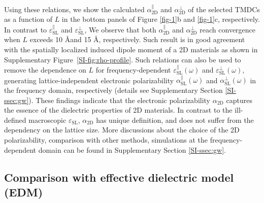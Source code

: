 %
%
Using these relations, we show the calculated
$\alpha_{\mathrm{2D}}^{\parallel}$ and $\alpha_{\mathrm{2D}}^{\perp}$
of the selected TMDCs as a function of $L$ in the bottom panels of
Figure \ref{fig-1}b and \ref{fig-1}c, respectively.  In contrast to
$\varepsilon_{\mathrm{SL}}^{\parallel}$ and
$\varepsilon_{\mathrm{SL}}^{\perp}$, We observe that both
$\alpha_{\mathrm{2D}}^{\parallel}$ and $\alpha_{\mathrm{2D}}^{\perp}$
reach convergence when $L$ exceeds 10 \AA and 15 \AA,
respectively. Such result is in good agreement with the spatially
localized induced dipole moment of a 2D materials as shown in
Supplementary Figure~\ref{SI-fig:rho-profile}.
%
%
Such relations can also be used to remove the dependence on $L$ for
frequency-dependent $\varepsilon^{\parallel}_{\mathrm{SL}}(\omega)$
and $\varepsilon^{\perp}_{\mathrm{SL}}(\omega)$, generating
lattice-independent electronic polarizability
$\alpha^{\parallel}_{\mathrm{SL}}(\omega)$ and
$\alpha^{\perp}_{\mathrm{SL}}(\omega)$ in the frequency domain,
respectively (details see Supplementary Section \ref{SI-ssec:gw}).
%
% 
% 
% 
% 
These findings indicate that the electronic polarizability $\alpha_{\mathrm{2D}}$ captures the essence
of the dielectric properties of 2D materials. In contrast to the ill-defined macroscopic $\varepsilon_{\mathrm{SL}}$, $\alpha_{\mathrm{2D}}$ has unique definition, and does not suffer from the dependency on the lattice size.
More discussions about the choice of the
2D polarizability, comparison with other methods, simulations at the
frequency-dependent domain can be found in Supplementary Section
\ref{SI-ssec:gw}.

\subsection{Comparison with effective dielectric model (EDM)}
\label{sec:comp-with-effect}

